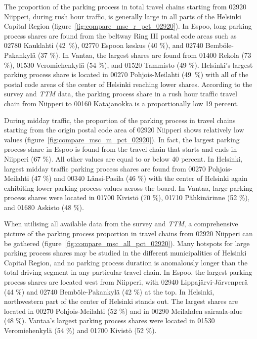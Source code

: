 The proportion of the parking process in total travel chains starting from 02920 Niipperi, during rush hour traffic, is generally large in all parts of the Helsinki Capital Region (figure~\ref{fig:compare_msc_r_pct_02920}). In Espoo, long parking process shares are found from the beltway Ring III postal code areas such as 02780 Kauklahti (42~\%), 02770 Espoon keskus (40 \%), and 02740 Bemböle-Pakankylä (37 \%). In Vantaa, the largest shares are found from 01400 Rekola (73 \%), 01530 Veromiehenkylä (54 \%), and 01520 Tammisto (49 \%). Helsinki's largest parking process share is located in 00270 Pohjois-Meilahti (49~\%) with all of the postal code areas of the center of Helsinki reaching lower shares. According to the survey and \textit{TTM} data, the parking process share in a rush hour traffic travel chain from Niipperi to 00160 Katajanokka is a proportionally low 19 percent.

During midday traffic, the proportion of the parking process in travel chains starting from the origin postal code area of 02920 Niipperi shows relatively low values (figure~\ref{fig:compare_msc_m_pct_02920}). In fact, the largest parking process share in Espoo is found from the travel chain that starts and ends in Niipperi (67 \%). All other values are equal to or below 40 percent. In Helsinki, largest midday traffic parking process shares are found from 00270 Pohjois-Meilahti (47 \%) and 00340 Länsi-Pasila (46 \%) with the center of Helsinki again exhibiting lower parking process values across the board. In Vantaa, large parking process shares were located in 01700 Kivistö (70 \%), 01710 Pähkinärinne (52 \%), and 01680 Askisto (48 \%).

When utilising all available data from the survey and \textit{TTM}, a comprehensive picture of the parking process proportion in travel chains from 02920 Niipperi can be gathered (figure~\ref{fig:compare_msc_all_pct_02920}). Many hotspots for large parking process shares may be studied in the different municipalities of Helsinki Capital Region, and no parking process duration is anomalously longer than the total driving segment in any particular travel chain. In Espoo, the largest parking process shares are located west from Niipperi, with 02940 Lippajärvi-Järvenperä (44 \%) and 02740 Bemböle-Pakankylä (42 \%) at the top. In Helsinki, northwestern part of the center of Helsinki stands out. The largest shares are located in 00270 Pohjois-Meilahti (52 \%) and in 00290 Meilahden sairaala-alue (48 \%). Vantaa's largest parking process shares were located in 01530 Veromiehenkylä (54 \%) and 01700 Kivistö (52 \%). 

